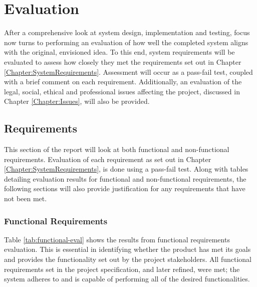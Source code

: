 \chapter{Evaluation}
\label{Chapter:Evaluation}
After a comprehensive look at system design, implementation and testing, focus now turns to performing an evaluation of how well the completed system aligns with the original, envisioned idea. To this end, system requirements will be evaluated to assess how closely they met the requirements set out in Chapter \ref{Chapter:SystemRequirements}. Assessment will occur as a pass-fail test, coupled with a brief comment on each requirement. Additionally, an evaluation of the legal, social, ethical and professional issues affecting the project, discussed in Chapter \ref{Chapter:Issues}, will also be provided.

\section{Requirements}
This section of the report will look at both functional and non-functional requirements. Evaluation of each requirement as set out in Chapter  \ref{Chapter:SystemRequirements}, is done using a pass-fail test. Along with tables detailing evaluation results for functional and non-functional requirements, the following sections will also provide justification for any requirements that have not been met.

\subsection{Functional Requirements}
Table \ref{tab:functional-eval} shows the results from functional requirements evaluation. This is essential in identifying whether the product has met its goals and provides the functionality set out by the project stakeholders. All functional requirements set in the project specification, and later refined, were met; the system adheres to and is capable of performing all of the desired functionalities. 

